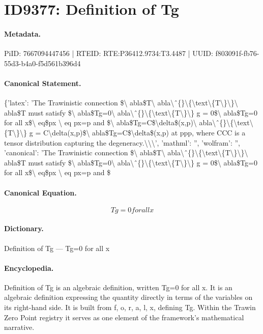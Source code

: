 \section*{ID9377: Definition of Tg}
\paragraph{Metadata.}
PiID: 7667094447456 | RTEID: RTE:P36412.9734:T3.4487 | UUID: f803091f-fb76-55d3-b4a0-f5d561b396d4

\paragraph{Canonical Statement.}
\{'latex': 'The Trawinistic connection \$\textbackslash{} abla\$T\textbackslash{} abla\textbackslash{}ˆ\{\}\textbackslash{}\{\textbackslash{}text\textbackslash{}\{T\textbackslash{}\}\textbackslash{}\}\textbackslash{} abla\$T must satisfy \$\textbackslash{} abla\$Tg=0\textbackslash{} abla\textbackslash{}ˆ\{\}\textbackslash{}\{\textbackslash{}text\textbackslash{}\{T\textbackslash{}\}\textbackslash{}\} g = 0\$\textbackslash{} abla\$Tg=0 for all x\$\textbackslash{} eq\$px \textbackslash{} eq px=p and \$\textbackslash{} abla\$Tg=C\$\textbackslash{}delta\$(x,p)\textbackslash{} abla\textbackslash{}ˆ\{\}\textbackslash{}\{\textbackslash{}text\textbackslash{}\{T\textbackslash{}\}\textbackslash{}\} g = C\textbackslash{}delta(x,p)\$\textbackslash{} abla\$Tg=C\$\textbackslash{}delta\$(x,p) at ppp, where CCC is a tensor distribution capturing the degeneracy.\textbackslash{}\textbackslash{}\textbackslash{}', 'mathml': '', 'wolfram': '', 'canonical': 'The Trawinistic connection \$\textbackslash{} abla\$T\textbackslash{} abla\textbackslash{}ˆ\{\}\textbackslash{}\{\textbackslash{}text\textbackslash{}\{T\textbackslash{}\}\textbackslash{}\}\textbackslash{} abla\$T must satisfy \$\textbackslash{} abla\$Tg=0\textbackslash{} abla\textbackslash{}ˆ\{\}\textbackslash{}\{\textbackslash{}text\textbackslash{}\{T\textbackslash{}\}\textbackslash{}\} g = 0\$\textbackslash{} abla\$Tg=0 for all x\$\textbackslash{} eq\$px \textbackslash{} eq px=p and \$

\paragraph{Canonical Equation.}
\[
Tg=0 for all x
\]

\paragraph{Dictionary.}
Definition of Tg — Tg=0 for all x

\paragraph{Encyclopedia.}
Definition of Tg is an algebraic definition, written Tg=0 for all x. It is an algebraic definition expressing the quantity directly in terms of the variables on its right-hand side. It is built from f, o, r, a, l, x, defining Tg. Within the Trawin Zero Point registry it serves as one element of the framework's mathematical narrative.
